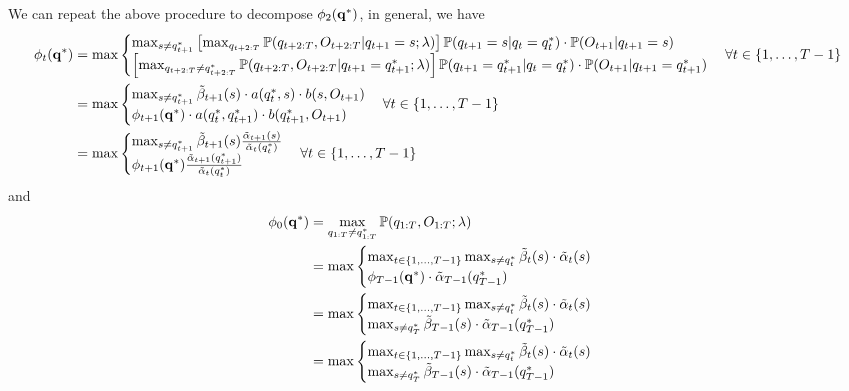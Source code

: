 We can repeat the above procedure to decompose $\phi_2(\mathbf{q}^*)$, in general, we have
\begin{equation*}
\begin{aligned}
\phi_t(\mathbf{q}^*) 
&= \max \begin{cases}
          \max_{s \ne q_{t+1}^*} \left[ \max_{q_{t+2:T}} \mathbb{P}(q_{t+2:T}, O_{t+2:T} |q_{t+1} = s; \lambda) \right] \mathbb{P}(q_{t+1} = s |q_t = q_t^*) \cdot 
               \mathbb{P}(O_{t+1} |q_{t+1} = s) \\
          \left[ \max_{q_{t+2:T} \ne q_{t+2:T}^*} \mathbb{P}(q_{t+2:T}, O_{t+2:T} |q_{t+1} = q_{t+1}^*; \lambda) \right]
               \mathbb{P}(q_{t+1} = q_{t+1}^* |q_t = q_t^*) \cdot \mathbb{P}(O_{t+1} |q_{t+1} = q_{t+1}^*)
        \end{cases}  \forall t \in \{1,\dots,T-1\} \\
&= \max \begin{cases}
          \max_{s \ne q_{t+1}^*} \tilde{\beta}_{t+1}(s) \cdot a(q_t^*, s) \cdot b(s, O_{t+1}) \\
          \phi_{t+1}(\mathbf{q}^*) \cdot a(q_t^*, q_{t+1}^*) \cdot b(q_{t+1}^*, O_{t+1})
        \end{cases}  \forall t \in \{1,\dots,T-1\} \\
&= \max \begin{cases}
          \max_{s \ne q_{t+1}^*} \tilde{\beta}_{t+1}(s) \frac{\tilde{\alpha}_{t+1}(s)}         {\tilde{\alpha}_t(q_t^*)} \\
          \phi_{t+1}(\mathbf{q}^*)                       \frac{\tilde{\alpha}_{t+1}(q_{t+1}^*)} {\tilde{\alpha}_t(q_t^*)}
        \end{cases}  \forall t \in \{1,\dots,T-1\} \\
\end{aligned}
\end{equation*}
and 
\begin{equation*}
\begin{aligned}
\phi_0(\mathbf{q}^*) 
&= \max_{q_{1:T} \ne q_{1:T}^*} \mathbb{P}(q_{1:T}, O_{1:T}; \lambda) \\
&= \max \begin{cases}
           \max_{t \in \{1,\dots,T-1\}} \max_{s \ne q_t^*} \tilde{\beta}_t(s) \cdot \tilde{\alpha}_t(s) \\
           \phi_{T-1}(\mathbf{q}^*) \cdot \tilde{\alpha}_{T-1}(q_{T-1}^*)
        \end{cases} \\
&= \max \begin{cases}
           \max_{t \in \{1,\dots,T-1\}} \max_{s \ne q_t^*} \tilde{\beta}_t(s) \cdot \tilde{\alpha}_t(s) \\
           \max_{s \ne q_{T}^*} \tilde{\beta}_{T-1}(s) \cdot \tilde{\alpha}_{T-1}(q_{T-1}^*)
        \end{cases} \\
&= \max \begin{cases}
           \max_{t \in \{1,\dots,T-1\}} \max_{s \ne q_t^*} \tilde{\beta}_t(s) \cdot \tilde{\alpha}_t(s) \\
           \max_{s \ne q_{T}^*} \tilde{\beta}_{T-1}(s) \cdot \tilde{\alpha}_{T-1}(q_{T-1}^*)
        \end{cases}
\end{aligned}
\end{equation*}



